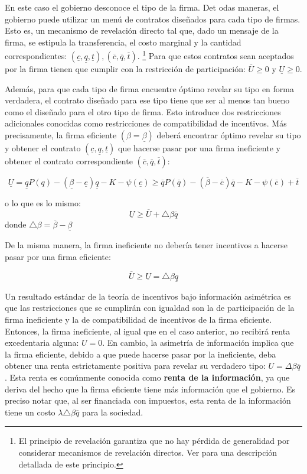 \documentclass[
  12pt,
  spanish,
]{book}
\begin{document}
En este caso el gobierno desconoce el tipo de la firma. Det odas
maneras, el gobierno puede utilizar un menú de contratos diseñados para
cada tipo de firmas. Esto es, un mecanismo de revelación directo tal
que, dado un mensaje de la firma, se estipula la transferencia, el costo
marginal y la cantidad correspondientes:
\({(\underline c, \underline q, \underline t), (\overline c, \overline q, \overline t)}\).
\footnote{El principio de revelación garantiza que no hay pérdida de
  generalidad por considerar mecanismos de revelación directos. Ver
  \citet{Laffont1993} para una descripción detallada de este principio.}
Para que estos contratos sean aceptados por la firma tienen que cumplir
con la restricción de participación: \(\overline U \geq 0\) y
\(\underline U \geq 0\).

Además, para que cada tipo de firma encuentre óptimo revelar su tipo en
forma verdadera, el contrato diseñado para ese tipo tiene que ser al
menos tan bueno como el diseñado para el otro tipo de firma. Esto
introduce dos restricciones adicionales conocidas como restricciones de
compatibilidad de incentivos. Más precisamente, la firma eficiente
\((β = \underline β)\) deberá encontrar óptimo revelar su tipo y obtener
el contrato \({(\underline c, \underline q, \underline t)}\) que hacerse
pasar por una firma ineficiente y obtener el contrato correspondiente
\({(\overline c, \overline q, \overline t)}\):

\[
\underline{U}=\underline{q}P\left(q\right)-\left(\underline{\beta}-\underline{e}\right)\underline{q}-K-\psi\left(\underline{e}\right)\geq\overline{q}P\left(\overline{q}\right)-\left(\overline{\beta}-\overline{e}\right)\overline{q}-K-\psi\left(\overline{e}\right)+\overline{t}
\]

o lo que es lo mismo:
\[\underline U \geq \overline U + \triangle \beta \overline q\] donde
\(\triangle \beta = \overline \beta - \underline \beta\)

De la misma manera, la firma ineficiente no debería tener incentivos a
hacerse pasar por una firma eficiente:

\[
\overline U \geq \underline U = \triangle \beta \underline q
\]

Un resultado estándar de la teoría de incentivos bajo información
asimétrica es que las restricciones que se cumplirán con igualdad son la
de participación de la firma ineficiente y la de compatibilidad de
incentivos de la firma eficiente. Entonces, la firma ineficiente, al
igual que en el caso anterior, no recibirá renta excedentaria alguna:
\(U= 0\). En cambio, la asimetría de información implica que la firma
eficiente, debido a que puede hacerse pasar por la ineficiente, deba
obtener una renta estrictamente positiva para revelar su verdadero tipo:
\(U = Δ\beta \overline q\). Esta renta es comúnmente conocida como
\textbf{renta de la información}, ya que deriva del hecho que la firma
eficiente tiene más información que el gobierno. Es preciso notar que,
al ser financiada con impuestos, esta renta de la información tiene un
costo \(\lambda \triangle \beta \overline q\) para la sociedad.
\end{document}
